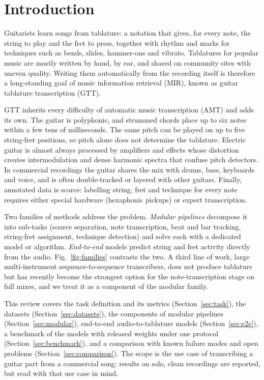 \section{Introduction}
\label{sec:intro}

Guitarists learn songs from tablature: a notation that gives, for every note,
the string to play and the fret to press, together with rhythm and marks for
techniques such as bends, slides, hammer-ons and vibrato. Tablatures for
popular music are mostly written by hand, by ear, and shared on community
sites with uneven quality. Writing them automatically from the recording
itself is therefore a long-standing goal of music information retrieval (MIR),
known as guitar tablature transcription (GTT).

GTT inherits every difficulty of automatic music transcription (AMT) and adds
its own. The guitar is polyphonic, and strummed chords place up to six notes
within a few tens of milliseconds. The same pitch can be played on up to five
string-fret positions, so pitch alone does not determine the tablature.
Electric guitar is almost always processed by amplifiers and effects whose
distortion creates intermodulation and dense harmonic spectra that confuse
pitch detectors. In commercial recordings the guitar shares the mix with
drums, bass, keyboards and voice, and is often double-tracked or layered with
other guitars. Finally, annotated data is scarce: labelling string, fret and
technique for every note requires either special hardware (hexaphonic pickups)
or expert transcription.

Two families of methods address the problem. \emph{Modular pipelines}
decompose it into sub-tasks (source separation, note transcription, beat and
bar tracking, string-fret assignment, technique detection) and solve each with
a dedicated model or algorithm. \emph{End-to-end} models predict string and
fret activity directly from the audio. Fig.~\ref{fig:families} contrasts the
two. A third line of work, large multi-instrument sequence-to-sequence
transcribers, does not produce tablature but has recently become the strongest
option for the note-transcription stage on full mixes, and we treat it as a
component of the modular family.

This review covers the task definition and its metrics
(Section~\ref{sec:task}), the datasets (Section~\ref{sec:datasets}), the
components of modular pipelines (Section~\ref{sec:modular}), end-to-end
audio-to-tablature models (Section~\ref{sec:e2e}), a benchmark of the models
with released weights under one protocol (Section~\ref{sec:benchmark}), and a
comparison with known failure modes and open problems
(Section~\ref{sec:comparison}). The scope is
the use case of transcribing a guitar part from a commercial song; results on
solo, clean recordings are reported, but read with that use case in mind.


